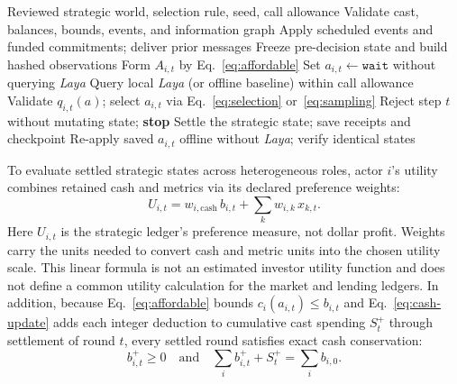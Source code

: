 \begin{algorithm}[t]
\caption{Strategic-round execution, synchronous settlement, and replay}
\label{alg:round}
\footnotesize
\begin{algorithmic}[1]
\Require Reviewed strategic world, selection rule, seed, call allowance
\State Validate cast, balances, bounds, events, and information graph
  \State Apply scheduled events and funded commitments; deliver prior messages
  \State Freeze pre-decision state and build hashed observations
    \State Form $A_{i,t}$ by Eq.~\eqref{eq:affordable}
      \State Set $a_{i,t}\gets\texttt{wait}$ without querying \textit{Laya}
    \Else
      \State Query local \textit{Laya} (or offline baseline) within call allowance
      \State Validate $q_{i,t}(a)$; select $a_{i,t}$ via Eq.~\eqref{eq:selection} or~\eqref{eq:sampling}
    \EndIf
  \EndFor
    \State Reject step $t$ without mutating state; \textbf{stop}
  \EndIf
  \State Settle the strategic state; save receipts and checkpoint
\EndFor
\State Re-apply saved $a_{i,t}$ offline without \textit{Laya}; verify identical states
\end{algorithmic}
\end{algorithm}

To evaluate settled strategic states across heterogeneous roles, actor
$i$'s utility combines retained cash and metrics via its declared preference
weights:
\begin{equation}
U_{i,t} = w_{i,\mathrm{cash}}\, b_{i,t} + \sum_k w_{i,k}\, x_{k,t}.
\label{eq:utility}
\end{equation}
Here $U_{i,t}$ is the strategic ledger's preference measure, not dollar profit.
Weights carry the units needed to convert cash and metric units into the
chosen utility scale. This linear formula is not an estimated investor utility
function and does not define a common utility calculation for the market and
lending ledgers.
In addition, because Eq.~\eqref{eq:affordable} bounds $c_i(a_{i,t})\le
b_{i,t}$ and Eq.~\eqref{eq:cash-update} adds each integer deduction to
cumulative cast spending $S_t^{+}$ through settlement of round $t$, every
settled round satisfies exact cash conservation:
\begin{equation}
b^{+}_{i,t}\geq 0 \quad\text{and}\quad \sum_i b^{+}_{i,t}+S_t^{+}=\sum_i b_{i,0}.
\label{eq:conservation}
\end{equation}

